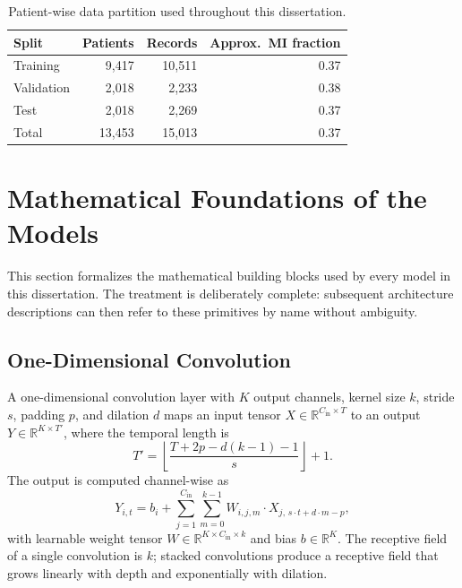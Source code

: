 \begin{table}[h]
\centering
\caption{Patient-wise data partition used throughout this dissertation.}
\label{tab:split-stats}
\begin{tabular}{lrrr}
\toprule
\textbf{Split} & \textbf{Patients} & \textbf{Records} & \textbf{Approx.\ MI fraction} \\
\midrule
Training   & 9{,}417 & 10{,}511 & 0.37 \\
Validation & 2{,}018 &  2{,}233 & 0.38 \\
Test       & 2{,}018 &  2{,}269 & 0.37 \\
\midrule
Total      & 13{,}453 & 15{,}013 & 0.37 \\
\bottomrule
\end{tabular}
\end{table}

\section{Mathematical Foundations of the Models}
\label{sec:math-foundations}

This section formalizes the mathematical building blocks used by every model in this dissertation. The treatment is deliberately complete: subsequent architecture descriptions can then refer to these primitives by name without ambiguity.

\subsection{One-Dimensional Convolution}

A one-dimensional convolution layer with $K$ output channels, kernel size $k$, stride $s$, padding $p$, and dilation $d$ maps an input tensor $X \in \mathbb{R}^{C_{\mathrm{in}} \times T}$ to an output $Y \in \mathbb{R}^{K \times T'}$, where the temporal length is
\begin{equation}
T' = \left\lfloor \frac{T + 2p - d(k - 1) - 1}{s} \right\rfloor + 1.
\end{equation}
The output is computed channel-wise as
\begin{equation}
Y_{i,t} = b_i + \sum_{j=1}^{C_{\mathrm{in}}} \sum_{m=0}^{k-1} W_{i, j, m} \cdot X_{j,\, s\cdot t + d\cdot m - p},
\label{eq:conv1d}
\end{equation}
with learnable weight tensor $W \in \mathbb{R}^{K \times C_{\mathrm{in}} \times k}$ and bias $b \in \mathbb{R}^{K}$. The receptive field of a single convolution is $k$; stacked convolutions produce a receptive field that grows linearly with depth and exponentially with dilation.

